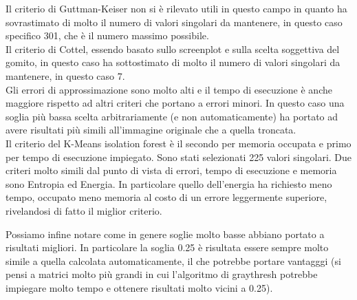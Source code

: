 \noindent Il criterio di Guttman-Keiser non si è rilevato utili in questo campo in quanto ha sovrastimato di molto il numero di valori singolari da mantenere, in questo caso specifico 301, che è il numero massimo possibile.\\
Il criterio di Cottel, essendo basato sullo screenplot e sulla scelta soggettiva del gomito, in questo caso ha sottostimato di molto il numero di valori singolari da mantenere, in questo caso 7.\\
Gli errori di approssimazione sono molto alti e il tempo di esecuzione è anche maggiore rispetto ad altri criteri che portano a errori minori. In questo caso una soglia più bassa scelta arbitrariamente (e non automaticamente) ha portato ad avere risultati più simili all'immagine originale che a quella troncata.\\
Il criterio del K-Means isolation forest è il secondo per memoria occupata e primo per tempo di esecuzione impiegato. Sono stati selezionati 225 valori singolari.
Due criteri molto simili dal punto di vista di errori, tempo di esecuzione e memoria sono Entropia ed Energia. In particolare quello dell'energia ha richiesto meno tempo, occupato meno memoria al costo di un errore leggermente superiore, rivelandosi di fatto il miglior criterio.

\noindent Possiamo infine notare come in genere soglie molto basse abbiano portato a risultati migliori. In particolare la soglia 0.25 è risultata essere sempre molto simile a quella calcolata automaticamente, il che potrebbe portare vantagggi (si pensi a matrici molto più grandi in cui l'algoritmo di graythresh potrebbe impiegare molto tempo e ottenere risultati molto vicini a 0.25).\\
